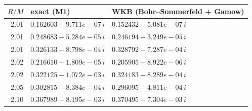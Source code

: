 \begin{tabular}{rll}\toprule
$R/M$ & exact (M1) & WKB (Bohr--Sommerfeld + Gamow)\\\midrule
2.01 & $0.162603-9.711e-07\,i$ & $0.152432-5.081e-07\,i$ \\
2.01 & $0.248683-5.284e-05\,i$ & $0.246194-3.249e-05\,i$ \\
2.01 & $0.326133-8.798e-04\,i$ & $0.328792-7.287e-04\,i$ \\
2.02 & $0.216610-1.809e-05\,i$ & $0.205905-8.922e-06\,i$ \\
2.02 & $0.322125-1.072e-03\,i$ & $0.324183-8.289e-04\,i$ \\
2.05 & $0.302815-8.384e-04\,i$ & $0.296095-4.811e-04\,i$ \\
2.10 & $0.367989-8.195e-03\,i$ & $0.370495-7.304e-03\,i$ \\
\bottomrule\end{tabular}
